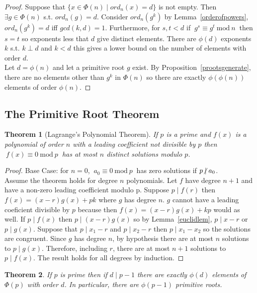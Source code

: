 \documentclass[12pt]{extarticle}
\renewcommand\qedsymbol{$\square$}
\newcommand{\divides}{\mid}
\newcommand{\ndivides}{\centernot \mid}
\newtheorem{theorem}{Theorem}[section]
\newenvironment{lproof}{\begin{proof} \renewcommand{\qedsymbol}{}}{\end{proof}}
\renewcommand{\mod}[3]{\: #1 \equiv #2 \: \mathrm{mod} \: #3 \:}
\begin{document}
\begin{lproof}
Suppose that $\{x \in \Phi (n) \mid ord_n(x) = d\}$ is not empty. Then $\exists g \in \Phi (n)$ s.t. $ord_n(g) = d$. Consider $ord_n(g^k)$ by Lemma~\ref{orderofpowers}, $ord_n(g^k) = d$ iff $gcd(k, d) = 1$. Furthermore, for $s,t < d$ if $\mod{g^s}{g^t}{n}$ then $s = t$ so exponents less that $d$ give distinct elements. There are $\phi (d)$ exponents $k$ s.t. $k \perp d$ and $k < d$ this gives a lower bound on the number of elements with order $d$. \\ Let $d = \phi (n)$ and let a primitive root $g$ exist. By Proposition~\ref{prootsgenerate}, there are no elements other than $g^k$ in $\Phi (n)$ so there are exactly $\phi (\phi (n))$ elements of order $\phi (n)$.
\end{lproof}

\subsection{The Primitive Root Theorem}


\begin{theorem} [Lagrange's Polynomial Theorem]
\label{lagrangepoly}
If $p$ is a prime and $f(x)$ is a polynomial of order $n$ with a leading coefficient not divisible by $p$ then $\mod{f(x)}{0}{p}$ has at most $n$ distinct solutions modulo $p$. 
\end{theorem}

\begin{proof}
Base Case: for $n = 0$, $\mod{a_0}{0}{p}$ has zero solutions if $p \ndivides a_0$.\\
Assume the theorem holds for degree $n$ polynomials. Let $f$ have degree $n+1$ and have a non-zero leading coefficient modulo p. Suppose $p \divides f(r)$ then $f(x) = (x-r)g(x) + pk$ where $g$ has degree $n$. $g$ cannot have a leading coeficient divisible by $p$ because then $f(x) = (x-r)g(x) + kp$ would as well. If $p \divides f(x)$ then $p \divides (x-r)g(x)$ so by Lemma~\ref{euclidlem}, $p \divides x-r$ or  $p \divides g(x)$. Suppose that $p \divides x_1 - r$ and $p \divides x_2 - r$ then $p \divides x_1 - x_2$ so the solutions are congruent. Since $g$ has degree $n$, by hypothesis there are at most $n$ solutions to $p \divides g(x)$. Therefore, including $r$, there are at most $n+1$ solutions to $p \divides f(x)$. The result holds for all degrees by induction.
\end{proof}



\begin{theorem}
\label{numelementsordprimes}
If $p$ is prime then if $d \divides p-1$ there are exactly $\phi (d)$ elements of $\Phi (p)$ with order $d$. In particular, there are $\phi (p-1)$ primitive roots.
\end{theorem}
\end{document}
